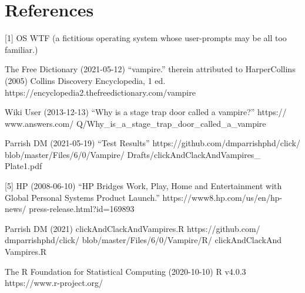\documentclass{article}
\begin{document}
\section*{References}

[1] OS WTF (a fictitious operating system whose user-prompts may
be all too familiar.)

\phantom{M}

\noindent
[2] The Free Dictionary (2021-05-12) ``vampire.'' therein attributed to 
HarperCollins (2005) Collins Discovery Encyclopedia, 1 ed.
https://encyclopedia2.\allowbreak thefreedictionary.com/vampire

\phantom{M}

\noindent
[3] Wiki User (2013-12-13) ``Why is a stage trap door called a
vampire?'' https:/\slash
www.\allowbreak answers.\allowbreak com\slash
Q/Why\_is\_a\_stage\_trap\_door\_called\_a\_vampire

\phantom{M}

\noindent
[4] Parrish DM (2021-05-19) ``Test Results''
https:/\slash github.com\slash dmparrishphd\slash click\slash
blob\slash master\slash Files\slash 6/0\slash Vampire\slash
Drafts\slash clickAndClackAnd\allowbreak Vampires\_\\
Plate1.pdf

\phantom{M}

\noindent
[5] HP (2008-06-10) ``HP Bridges Work, Play, Home and
Entertainment with Global Personal Systems Product Launch.''
https:/\slash www8.hp.com\slash us/en\slash hp-news\slash
press-release.html?\allowbreak id=169893

\phantom{M}

\noindent
[6] Parrish DM (2021) clickAndClackAndVampires.R
https:/\slash github.com\slash\\
dmparrishphd\slash click\slash
blob\slash master\slash Files\slash 6/0\slash Vampire/R\slash
clickAndClackAnd\\
Vampires.R

\phantom{M}

\noindent
[7] The R Foundation for Statistical Computing (2020-10-10) R v4.0.3
https:/\slash www.\allowbreak r-project.\allowbreak org/
\end{document}
